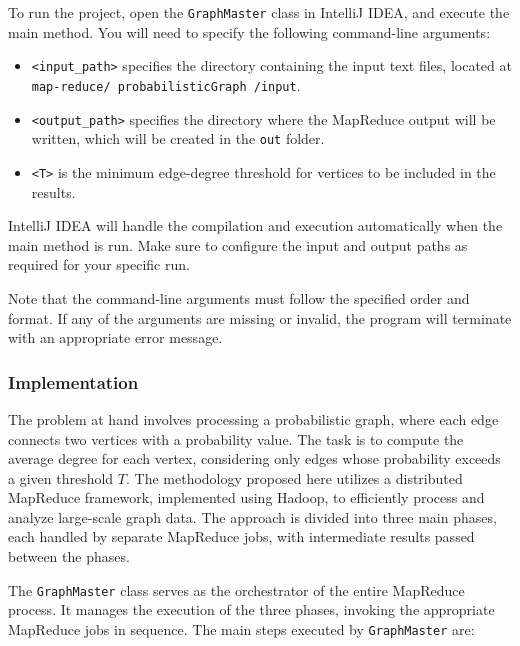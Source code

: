 \documentclass[acmlarge]{acmart}
\begin{document}
To run the project, open the \texttt{GraphMaster} class in IntelliJ IDEA, and execute the main method.
You will need to specify the following command-line arguments:

\begin{itemize}
  \item \texttt{<input\_path>} specifies the directory containing the input text files, located at
        \texttt{map-reduce/ probabilisticGraph /input}.
  \item \texttt{<output\_path>} specifies the directory where the MapReduce output will be written, which will be
        created in the \texttt{out} folder.
  \item \texttt{<T>} is the minimum edge-degree threshold for vertices to be included in the results.
\end{itemize}

IntelliJ IDEA will handle the compilation and execution automatically when the main method is run.
Make sure to configure the input and output paths as required for your specific run.

Note that the command-line arguments must follow the specified order and format.
If any of the arguments are missing or invalid, the program will terminate with an appropriate error message.

\subsubsection{Implementation}
The problem at hand involves processing a probabilistic graph, where each edge connects two vertices with a probability
value.
The task is to compute the average degree for each vertex, considering only edges whose probability exceeds a given
threshold \( T \).
The methodology proposed here utilizes a distributed MapReduce framework, implemented using Hadoop, to efficiently
process and analyze large-scale graph data.
The approach is divided into three main phases, each handled by separate MapReduce jobs, with intermediate results
passed between the phases.

The \texttt{GraphMaster} class serves as the orchestrator of the entire MapReduce process.
It manages the execution of the three phases, invoking the appropriate MapReduce jobs in sequence.
The main steps executed by \texttt{GraphMaster} are:
\end{document}
